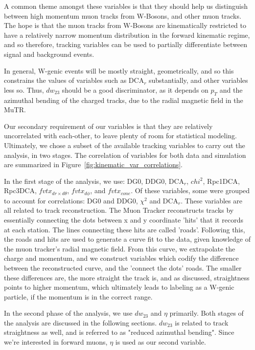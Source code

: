 A common theme amongst these variables is that they should help us distinguish
between high momentum muon tracks from W-Bosons, and other muon tracks. The hope
is that the muon tracks from W-Bosons are kinematically restricted to have a
relatively narrow momentum distribution in the forward kinematic regime, and so
therefore, tracking variables can be used to partially differentiate between
signal and background events.

In general, W-genic events will be mostly straight, geometrically, and so this
constrains the values of variables such as DCA${}_r$ substantially, and other
variables less so. Thus, $dw_{23}$ should be a good discriminator, as it depends
on $p_T$ and the azimuthal bending of the charged tracks, due to the radial
magnetic field in the MuTR.

Our secondary requirement of our variables is that they are relatively
uncorrelated with each-other, to leave plenty of room for statistical modeling.
Ultimately, we chose a subset of the available tracking variables to carry out
the analysis, in two stages. The correlation of variables for both data and
simulation are summarized in Figure~\ref{fig:kinematic_var_correlations}.

In the first stage of the analysis, we use: DG0, DDG0, DCA${}_r$, $chi^2$,
Rpc1DCA, Rpc3DCA, $fvtx_{dr \times d\theta}$, $fvtx_{d\phi}$, and $fvtx_{cone}$.
Of these variables, some were grouped to account for correlations: DG0 and DDG0,
$\chi^2$ and DCA${}_r$. These variables are all related to track reconstruction.
The Muon Tracker reconstructs tracks by essentially connecting the dots between
x and y coordinate 'hits' that it records at each station. The lines connecting
these hits are called 'roads'. Following this, the roads and hits are used to
generate a curve fit to the data, given knowledge of the muon tracker's radial
magnetic field. From this curve, we extrapolate the charge and momentum, and we
construct variables which codify the difference between the reconstructed curve,
and the 'connect the dots' roads. The smaller these differences are, the more
straight the track is, and as discussed, straightness points to higher momentum,
which ultimately leads to labeling as a W-genic particle, if the momentum is in
the correct range.

In the second phase of the analysis, we use $dw_{23}$ and $\eta$ primarily. Both
stages of the analysis are discussed in the following sections. $dw_{23}$ is
related to track straightness as well, and is referred to as "reduced azimuthal
bending". Since we're interested in forward muons, $\eta$ is used as our second
variable.

